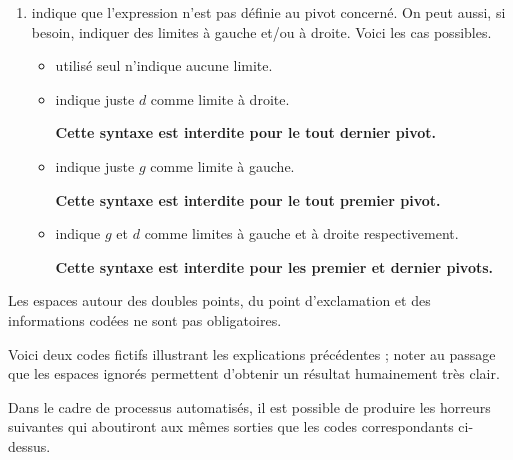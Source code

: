 \documentclass[12pt, a4paper]{article}
\begin{document}
\begin{enumerate}
\begin{itemize}
\begin{enumerate}
            \item \tdocinlatex{!} indique que
l'expression n'est pas définie au pivot concerné.
            On peut aussi, si besoin, indiquer des limites à gauche et/ou à droite. Voici les cas possibles.
            \begin{itemize}
                \item \tdocinlatex{!} utilisé seul n'indique aucune limite.


                \item  {} indique juste $d$ comme limite à droite.

                \textbf{Cette syntaxe est interdite pour le tout dernier pivot.}


                \item {} indique juste $g$ comme limite à gauche.

                \textbf{Cette syntaxe est interdite pour le tout premier pivot.}


                \item  {} indique $g$ et $d$ comme limites à gauche et à droite respectivement.

                \textbf{Cette syntaxe est interdite pour les premier et dernier pivots.}
            \end{itemize}
        \end{enumerate}
    \end{itemize}
\end{enumerate}








\begin{tdocnote}
    Les espaces autour des doubles points, du point d'exclamation et des informations codées ne sont pas obligatoires.
\end{tdocnote}




Voici deux codes fictifs illustrant les explications précédentes ; noter au passage que les espaces ignorés permettent d'obtenir un résultat humainement très clair.
\begin{multicols}{2}

\end{multicols}

Dans le cadre de processus automatisés, il est possible de produire les horreurs suivantes qui aboutiront aux mêmes sorties que les codes correspondants ci-dessus.
\begin{multicols}{2}

\end{multicols}
\end{document}
